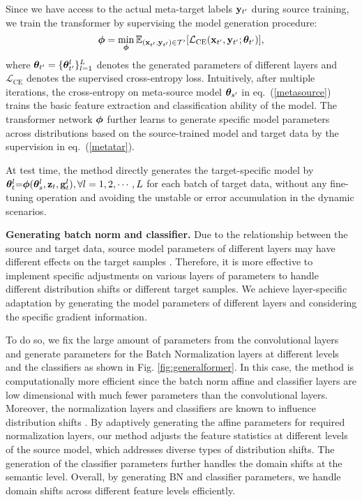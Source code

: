 Since we have access to the actual meta-target labels $\mathbf{y}_{t'}$ during source training, we train the transformer by supervising the model generation procedure:
\begin{equation}
\label{metatar}
\boldsymbol{\phi} = \min _{\boldsymbol{\phi}} \mathbb{E}_{(\mathbf{x}_{t'}, \mathbf{y}_{t'}) \in \mathcal{T}' }[\mathcal{L}_{\mathrm{CE}}(\mathbf{x}_{t'}, \mathbf{y}_{t'}; \boldsymbol{\theta}_{t'})],
\end{equation}
where $\boldsymbol{\theta}_{t'} = \{ \boldsymbol{\theta}^l_{t'} \}_{l=1}^L$ denotes the generated parameters of different layers and $\mathcal{L}_{\mathrm{CE}}$ denotes the supervised cross-entropy loss. Intuitively, after multiple iterations, the cross-entropy on meta-source model $\boldsymbol{\theta}_{s'}$ in eq.~(\ref{metasource}) trains the basic feature extraction and classification ability of the model. The transformer network $\boldsymbol{\phi}$ further learns to generate specific model parameters across distributions based on the source-trained model and target data by the supervision in eq.~(\ref{metatar}).

At test time, the method directly generates the target-specific model by $\boldsymbol{\theta}^l_{t} {=} \boldsymbol{\phi}(\boldsymbol{\theta}^l_{s}, \mathbf{z}_{t}, \mathbf{g}_{t}^l), \forall l=1,2,\cdots, L$ for each batch of target data, without any fine-tuning operation and avoiding the unstable  or error accumulation in the dynamic scenarios.

\noindent
\textbf{Generating batch norm and classifier.} Due to the relationship between the source and target data, source model parameters of different layers may have different effects on the target samples \cite{lee2022surgical}.
Therefore, it is more effective to implement specific adjustments on various layers of parameters to handle different distribution shifts or different target samples. We achieve layer-specific adaptation by generating the model parameters of different layers and considering the specific gradient information.

To do so, we fix the large amount of parameters from the convolutional layers and generate parameters for the Batch Normalization layers at different levels and the classifiers as shown in Fig. \ref{fig:generalformer}.
In this case, the method is computationally more efficient since the batch norm affine and classifier layers are low dimensional with much fewer parameters than the convolutional layers.
Moreover, the normalization layers and classifiers are known to influence distribution shifts \cite{huang2017arbitrary,xiao2022learning,lim2023ttn,iwasawa2021test}. 
By adaptively generating the affine parameters for required normalization layers, our method adjusts the feature statistics at different levels of the source model, which addresses diverse types of distribution shifts.
The generation of the classifier parameters further handles the domain shifts at the semantic level. 
Overall, by generating BN and classifier parameters, we handle domain shifts across different feature levels efficiently.


